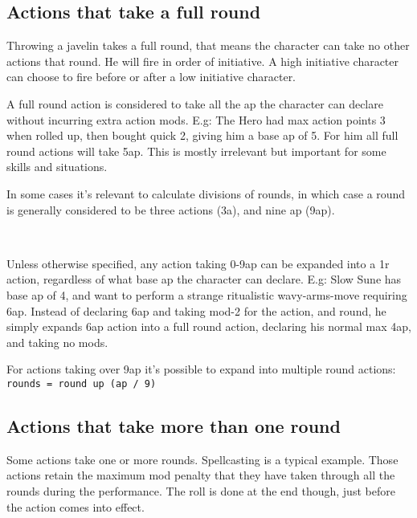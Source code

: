 \subsection*{Actions that take a full round}
\label{sec:fullroundactions}
Throwing a javelin takes a full round, that means the character can take no other actions that round. He will fire in order of initiative. A high initiative character can choose to fire before or after a low initiative character.

A full round action is considered to take all the ap the character can declare without incurring extra action mods. E.g: The Hero had max action points 3 when rolled up, then bought quick 2, giving him a base ap of 5. For him all full round actions will take 5ap. This is mostly irrelevant but important for some skills and situations.

In some cases it's relevant to calculate divisions of rounds, in which case a round is generally considered to be three actions (3a), and nine ap (9ap). 


\

Unless otherwise specified, any action taking 0-9ap can be expanded into a 1r action, regardless of what base ap the character can declare. E.g: Slow Sune has base ap of 4, and want to perform a strange ritualistic wavy-arms-move requiring 6ap. Instead of declaring 6ap and taking mod-2 for the action, and round, he simply expands 6ap action into a full round action, declaring his normal max 4ap, and taking no mods.

For actions taking over 9ap it's possible to expand into multiple round actions:\\
\verb|rounds = round up (ap / 9)|


\subsection*{Actions that take more than one round}
\label{sec:multiroundactions}
Some actions take one or more rounds. Spellcasting is a typical example. Those actions retain the maximum mod penalty that they have taken through all the rounds during the performance. The roll is done at the end though, just before the action comes into effect.


